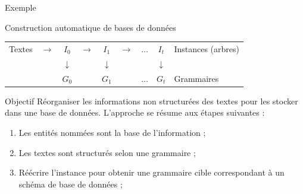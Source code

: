 \begin{frame}{Exemple}
\begin{figure}[htb]
\begin{adjustbox}{max width=\linewidth}
        \end{adjustbox}
    \end{figure}
\end{frame}

\begin{frame}{Construction automatique de bases de données}
    \centering
    \begin{adjustbox}{max width=.8\linewidth}
        \begin{tabular}{cccccccc|l}
            Textes & $\rightarrow$ & $I_0$        & $\rightarrow$ & $ I_1$       & $\rightarrow$ & $ \dots$ & $I_t$        & Instances (arbres) \\
                   &               & $\downarrow$ &               & $\downarrow$ &               &          & $\downarrow$ &                    \\
                   &               & $G_0$        &               & $G_1$        &               & $ \dots$ & $G_t$        & Grammaires         \\
        \end{tabular}
    \end{adjustbox}

    \vfill

    \begin{block}{Objectif}
        Réorganiser les informations non structurées des textes pour les stocker dans une base de données.
        L'approche se résume aux étapes suivantes :
        \begin{enumerate}
            \item Les entités nommées sont la base de l'information ;
            \item Les textes sont structurés selon une grammaire ;
            \item Réécrire l'instance pour obtenir une grammaire cible correspondant à un schéma de base de données ;
        \end{enumerate}
    \end{block}
\end{frame}

